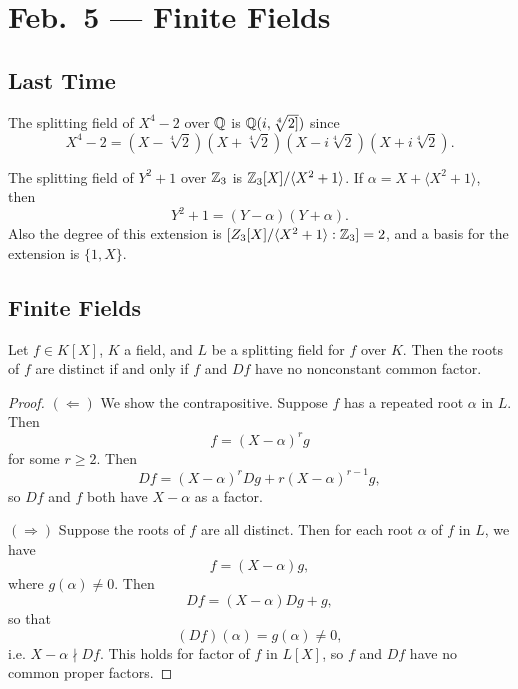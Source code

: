 \chapter{Feb.~5 --- Finite Fields}

\section{Last Time}

\begin{example}
  The splitting field of $X^4 - 2$ over $\mathbb{Q}$ is
  $\mathbb{Q}(i, \sqrt[4]{2]})$ since
  \[
    X^4 - 2 = (X - \sqrt[4]{2})(X + \sqrt[4]{2})(X - i\sqrt[4]{2})(X + i\sqrt[4]{2}).
  \]
\end{example}

\begin{example}
  The splitting field of $Y^2 + 1$ over $\mathbb{Z}_3$ is
  $\mathbb{Z}_3[X] / \langle X^2 + 1 \rangle$. If
  $\alpha = X + \langle X^2 + 1 \rangle$, then
  \[
    Y^2 + 1 = (Y - \alpha)(Y + \alpha).
  \]
  Also the degree of this extension is
  $[Z_3[X] / \langle X^2 + 1 \rangle : \mathbb{Z}_3] = 2$, and
  a basis for the extension is $\{1, X\}$.
\end{example}

\section{Finite Fields}
\begin{lemma}
  \label{lem:distinct-roots}
  Let $f \in K[X]$, $K$ a field, and $L$ be a splitting
  field for $f$ over $K$. Then the roots of $f$ are
  distinct if and only if $f$ and $Df$ have no
  nonconstant common factor.
\end{lemma}

\begin{proof}
  $(\Leftarrow)$ We show the contrapositive. Suppose
  $f$ has a repeated root $\alpha$ in $L$. Then
  \[
    f = (X - \alpha)^r g
  \]
  for some $r \ge 2$. Then
  \[
    Df = (X - \alpha)^r Dg + r(X - \alpha)^{r - 1} g,
  \]
  so $Df$ and $f$ both have $X - \alpha$ as a factor.

  $(\Rightarrow)$ Suppose the roots of $f$ are
  all distinct. Then for each root $\alpha$ of $f$
  in $L$, we have
  \[
    f = (X - \alpha)g,
  \]
  where $g(\alpha) \ne 0$. Then
  \[
    Df = (X - \alpha)Dg + g,
  \]
  so that
  \[
    (Df)(\alpha) = g(\alpha) \ne 0,
  \]
  i.e. $X - \alpha {\nmid} Df$. This holds for factor
  of $f$ in $L[X]$, so $f$ and $Df$ have no common
  proper factors.
\end{proof}

